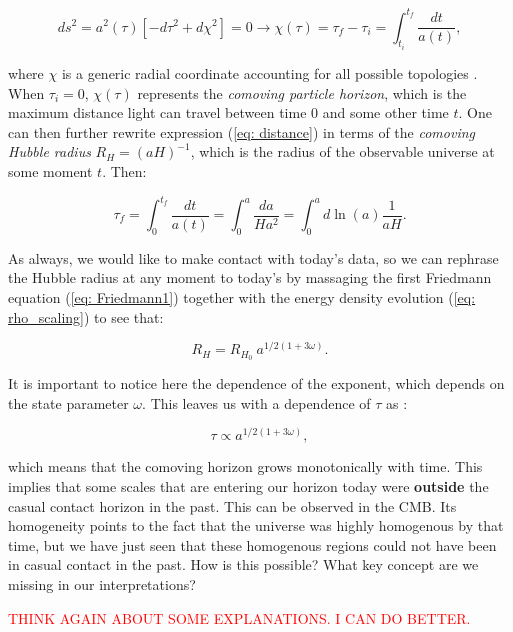 \documentclass[11pt, a4paper]{article} %
\begin{document}
\begin{equation}\label{eq: distance}
	ds^{2} = a^{2}(\tau)\left[-d\tau^{2} + d\chi^{2}\right]=0 \longrightarrow \chi(\tau) = \tau_{f} - \tau_{i} = \int^{t_{f}}_{t_{i}} \frac{dt}{a(t)},
\end{equation}

where $\chi$ is a generic radial coordinate accounting for all possible topologies \cite{baumann2009tasi}. When $\tau_{i} =0$, $\chi(\tau)$ represents the \textit{comoving particle horizon}, which is the maximum distance light can travel between time 0 and some other time $t$. One can then further rewrite expression (\ref{eq: distance}) in terms of the \textit{comoving Hubble radius} $R_{H} = (a H)^{-1}$, which is the radius of the observable universe at some moment $t$. Then:

\begin{equation}
	\tau_{f} = \int^{t_{f}}_{0} \frac{dt}{a(t)} = \int^{a}_{0} \frac{da}{H a^{2}} = \int^{a}_{0} d \ln(a) \frac{1}{a H}.
\end{equation}

As always, we would like to make contact with today's data, so we can rephrase the Hubble radius at any moment to today's by massaging the first Friedmann equation (\ref{eq: Friedmann1}) together with the energy density evolution (\ref{eq: rho_scaling}) to see that:

\begin{equation}\label{eq: hubble_rad}
	R_{H} = R_{H_{0}} \: a ^{1/2(1+ 3 \omega)}.
\end{equation}

It is important to notice here the dependence of the exponent, which depends on the state parameter $\omega$. This leaves us with a dependence of $\tau$ as :

\begin{equation}
	\tau \propto a^{1/2\left(1+3\omega\right)},
\end{equation}

which means that the comoving horizon grows monotonically with time. This implies that some scales that are entering our horizon today were \textbf{outside} the casual contact horizon in the past. This can be observed in the CMB. Its homogeneity points to the fact that the universe was highly homogenous by that time, but we have just seen that these homogenous regions could not have been in casual contact in the past. How is this possible? What key concept are we missing in our interpretations?

\textcolor{red}{THINK AGAIN ABOUT SOME EXPLANATIONS. I CAN DO BETTER.}
\end{document}
